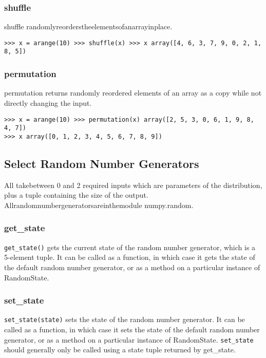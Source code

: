 \documentclass[KSmain.tex]{subfiles}
\begin{document}
\subsubsection{shuffle}
shuffle randomlyreorderstheelementsofanarrayinplace.
\begin{verbatim}
>>> x = arange(10) >>> shuffle(x) >>> x array([4, 6, 3, 7, 9, 0, 2, 1, 8, 5])
\end{verbatim}
\subsubsection{permutation}
permutation returns randomly reordered elements of an array as a copy while not directly changing the input.
\begin{framed}
\begin{verbatim}
>>> x = arange(10) >>> permutation(x) array([2, 5, 3, 0, 6, 1, 9, 8, 4, 7])
>>> x array([0, 1, 2, 3, 4, 5, 6, 7, 8, 9])
\end{verbatim}
\end{framed}
\subsection{Select Random Number Generators}

All takebetween 0 and 2 required inputs which are parameters of the distribution, plus a tuple containing the size of the output. Allrandomnumbergeneratorsareinthemodule 
numpy.random.


\newpage
\subsubsection{get\_state}
\texttt{get\_state()} gets the current state of the random number generator, which is a 5-element tuple. It can be
called as a function, in which case it gets the state of the default random number generator, or as a method
on a particular instance of RandomState.
\subsubsection{set\_state}
\texttt{set\_state(state)} sets the state of the random number generator. It can be called as a function, in which
case it sets the state of the default random number generator, or as a method on a particular instance of
RandomState. \texttt{set\_state} should generally only be called using a state tuple returned by get\_state.
\end{document}
